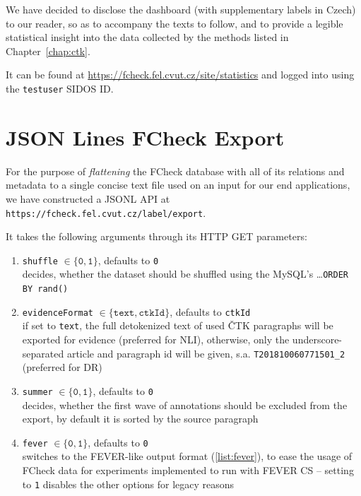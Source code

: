 We have decided to disclose the dashboard (with supplementary labels in Czech) to our reader, so as to accompany the texts to follow, and to provide a legible statistical insight into the data collected by the methods listed in Chapter~\ref{chap:ctk}.

It can be found at \url{https://fcheck.fel.cvut.cz/site/statistics} and logged into using the \"{\texttt{testuser}} \textsf{SIDOS ID}.

\section{JSON Lines FCheck Export}
\label{sec:export}
For the purpose of \textit{flattening} the \textsf{FCheck} database with all of its relations and metadata to a single concise text file used on an input for our end applications, we have constructed a \textsf{JSONL API} at \texttt{https://fcheck.fel.cvut.cz/label/export}.

It takes the following arguments through its \textsf{HTTP GET} parameters:
\begin{enumerate}
    \item \texttt{shuffle} $\in\{\texttt{0},\texttt{1}\}$, defaults to \texttt{0}\\ decides, whether the dataset should be shuffled using the \textsf{MySQL}'s \dots\texttt{ORDER BY rand()}
    \item \texttt{evidenceFormat} $\in\{\texttt{text},\texttt{ctkId}\}$, defaults to \texttt{ctkId}\\
    if set to \texttt{text}, the full detokenized text of used \textsf{ČTK} paragraphs will be exported for evidence (preferred for NLI), otherwise, only the underscore-separated article and paragraph id will be given, s.a. \texttt{T201810060771501\_2} (preferred for DR)
    \item \texttt{summer} $\in\{\texttt{0},\texttt{1}\}$, defaults to \texttt{0}\\ decides, whether the first wave of annotations  should be excluded from the export, by default it is sorted by the source paragraph
    \item \texttt{fever} $\in\{\texttt{0},\texttt{1}\}$, defaults to \texttt{0}\\ switches to the \textsf{FEVER}-like output format (\ref{list:fever}), to ease the usage of \textsf{FCheck} data for experiments implemented to run with \textsf{FEVER CS} -- setting to \texttt{1} disables the other options for legacy reasons
\end{enumerate}

